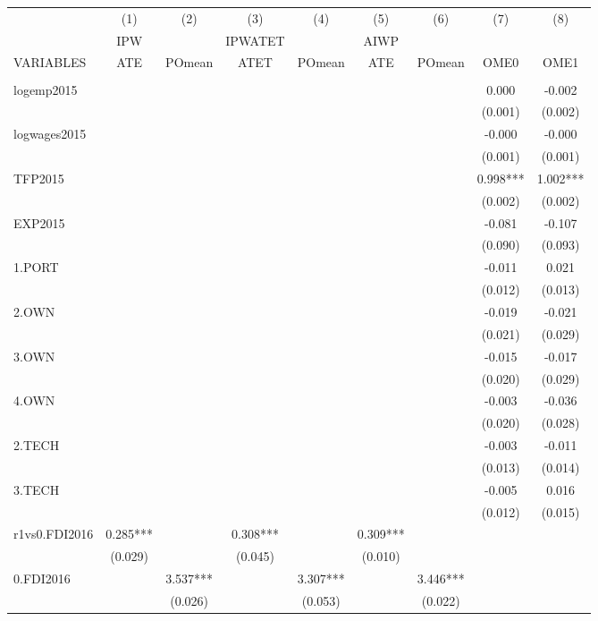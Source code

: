 \documentclass[]{article}
\begin{document}
\begin{landscape}
\centering
\begin{adjustbox}{width=1.8\textwidth}
\begin{tabular}{lcccccccc} \hline
 & (1) & (2) & (3) & (4) & (5) & (6) & (7) & (8) \\
 & IPW &  & IPWATET &  & AIWP &  &  &  \\
VARIABLES & ATE & POmean & ATET & POmean & ATE & POmean & OME0 & OME1 \\ \hline
 &  &  &  &  &  &  &  &  \\
logemp2015 &  &  &  &  &  &  & 0.000 & -0.002 \\
 &  &  &  &  &  &  & (0.001) & (0.002) \\
logwages2015 &  &  &  &  &  &  & -0.000 & -0.000 \\
 &  &  &  &  &  &  & (0.001) & (0.001) \\
TFP2015 &  &  &  &  &  &  & 0.998*** & 1.002*** \\
 &  &  &  &  &  &  & (0.002) & (0.002) \\
EXP2015 &  &  &  &  &  &  & -0.081 & -0.107 \\
 &  &  &  &  &  &  & (0.090) & (0.093) \\
1.PORT &  &  &  &  &  &  & -0.011 & 0.021 \\
 &  &  &  &  &  &  & (0.012) & (0.013) \\
2.OWN &  &  &  &  &  &  & -0.019 & -0.021 \\
 &  &  &  &  &  &  & (0.021) & (0.029) \\
3.OWN &  &  &  &  &  &  & -0.015 & -0.017 \\
 &  &  &  &  &  &  & (0.020) & (0.029) \\
4.OWN &  &  &  &  &  &  & -0.003 & -0.036 \\
 &  &  &  &  &  &  & (0.020) & (0.028) \\
2.TECH &  &  &  &  &  &  & -0.003 & -0.011 \\
 &  &  &  &  &  &  & (0.013) & (0.014) \\
3.TECH &  &  &  &  &  &  & -0.005 & 0.016 \\
 &  &  &  &  &  &  & (0.012) & (0.015) \\
r1vs0.FDI2016 & 0.285*** &  & 0.308*** &  & 0.309*** &  &  &  \\
 & (0.029) &  & (0.045) &  & (0.010) &  &  &  \\
0.FDI2016 &  & 3.537*** &  & 3.307*** &  & 3.446*** &  &  \\
 &  & (0.026) &  & (0.053) &  & (0.022) &  &  \\

\end{tabular}
\end{adjustbox}
\end{landscape}
\end{document}
